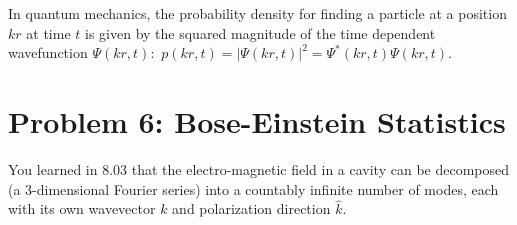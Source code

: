 \documentclass[12pt]{article}
\begin{document}
In quantum mechanics, the probability density for finding a particle at a position $kr$ at time $t$ is given by the squared magnitude of the time dependent wavefunction $\Psi(kr, t):$
$p(kr, t) = |\Psi(kr, t)|^2 = \Psi^*(kr, t)\Psi(kr, t).$

\section*{Problem 6: Bose-Einstein Statistics}

You learned in 8.03 that the electro-magnetic field in a cavity can be decomposed (a 3-dimensional Fourier series) into a countably infinite number of modes, each with its own wavevector $k$ and polarization direction $\hat{k}$. 
\end{document}
